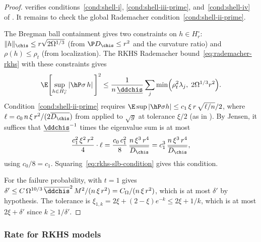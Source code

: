 \documentclass{article}
\begin{document}
\begin{proof}
 verifies
conditions~\ref{cond:shell-i}, \ref{cond:shell-iii-prime}, and~\ref{cond:shell-iv}
of .
It remains to check the global Rademacher
condition~\ref{cond:shell-ii-prime}.

The Bregman ball containment gives
two constraints on $h \in H_r^\circ$:
$\|h\|_{\chis} \le r\sqrt{2\Omega^{1/3}}$
(from $\P D_{\chis} \le r^2$
and the curvature ratio)
and $\rho(h) \le \rho_t$
(from localization).
The RKHS Rademacher bound~\eqref{eq:rademacher-rkhs}
with these constraints gives
\[
\E \qty[\sup_{h \in H_r^\circ}
  \abs*{\hP \sigma\, h}]^2
  \le \frac{1}{n\,\underline{\ddchis}}
    \sum_j \min\!\qty(\rho_t^2\lambda_j,\;
      2\Omega^{1/3}r^2).
\]
Condition~\ref{cond:shell-ii-prime} requires
$\E\sup|\hP\sigma h|
  \le c_1\, \xi\, r\, \sqrt{\ell/n}/2$,
where $\ell = c_0\, n\, \xi\, r^2/(2\overline{D_{\chis}})$
from 
applied to $\sqrt{g}$
at tolerance $\xi/2$
(as in ).
By Jensen, it suffices that
$\underline{\ddchis}^{-1}$ times the eigenvalue sum
is at most
\[
\frac{c_1^2\, \xi^2\, r^2}{4} \cdot \ell
  = \frac{c_0\, c_1^2}{8}\,
    \frac{n\, \xi^3\, r^4}{\overline{D_{\chis}}}
  = c_1^3\, \frac{n\, \xi^3\, r^4}{\overline{D_{\chis}}},
\]
using $c_0/8 = c_1$.
Squaring~\eqref{eq:rkhs-slb-condition}
gives this condition.

For the failure probability,
with $t = 1$ gives
$\delta' \le C\,\Omega^{10/3}\,
  \overline{\ddchis}^2\, M^2 / (n\,\xi\,r^2)
  = C_\Omega/(n\,\xi\,r^2)$,
which is at most $\delta'$
by hypothesis.
The tolerance is
$\xi_{1,k} = 2\xi + (2-\xi)e^{-k} \le 2\xi + 1/k$,
which is at most $2\xi + \delta'$
since $k \ge 1/\delta'$.
\end{proof}

\subsubsection{Rate for RKHS models}
\end{document}
